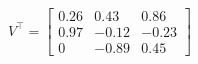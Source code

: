 \documentclass[preview]{standalone}
\begin{document}
\begin{align*}
V^\top=\left[\begin{matrix}0.26&0.43&0.86\\0.97&-0.12&-0.23\\0&-0.89&0.45\end{matrix}\right]
\end{align*}
\end{document}
